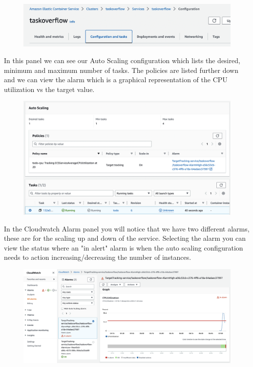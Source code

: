 \documentclass{csse4400}
\begin{document}
\begin{figure}[H]
  \begin{center}
    \includegraphics[width=\textwidth]{images/ecs1}
  \end{center}
\end{figure}

In this panel we can see our Auto Scaling configuration which lists the desired, minimum and maximum number of tasks. The policies are listed further down and we can view the alarm which is a graphical representation of the CPU utilization vs the target value.

\begin{figure}[H]
  \begin{center}
    \includegraphics[width=\textwidth]{images/ecs2}
  \end{center}
\end{figure}

In the Cloudwatch Alarm panel you will notice that we have two different alarms,
these are for the scaling up and down of the service.
Selecting the alarm you can view the status where an "in alert" alarm is when the auto scaling configuration needs to action increasing/decreasing the number of instances.

\begin{figure}[H]
  \begin{center}
    \includegraphics[width=\textwidth]{images/ecs3}
  \end{center}
\end{figure}
\end{document}
